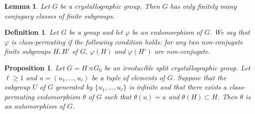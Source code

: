 \documentclass[10pt,a4paper]{amsart}
\newtheorem{de}{Definition}
\newtheorem{lemme}{Lemma}
\newtheorem{prop}{Proposition}
\renewcommand{\geq}{\geqslant}
\begin{document}
\begin{lemme}\label{finitely_many}
Let $G$ be a crystallographic group. Then $G$ has only finitely many conjugacy classes of finite subgroups.
\end{lemme}

\begin{de}\label{class-permuting}Let $G$ be a group and let $\varphi$ be an endomorphism of $G$. We say that $\varphi$ is \emph{class-permuting} if the following condition holds: for any two non-conjugate finite subgroups $H,H'$ of $G$, $\varphi(H)$ and $\varphi(H')$ are non-conjugate.\end{de}

\begin{prop}\label{15janvier2026}
Let $G=H\rtimes G_0$ be an irreducible split crystallographic group. Let $\ell\geq 1$ and $u=(u_1,\ldots,u_{\ell})$ be a tuple of elements of $G$. Suppose that the subgroup $U$ of $G$ generated by $\lbrace u_1,\ldots,u_{\ell}\rbrace$ is infinite and that there exists a class-permuting endomorphism $\theta$ of $G$ such that $\theta(u)=u$ and $\theta(H)\subset H$. Then $\theta$ is an automorphism of $G$.
\end{prop}
\end{document}
